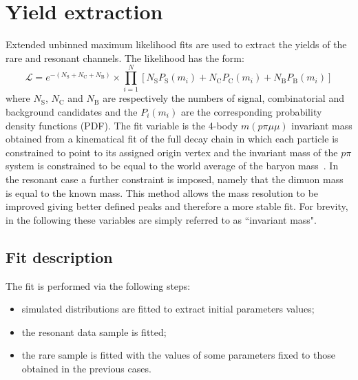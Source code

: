 \section{Yield extraction}

Extended unbinned maximum likelihood fits are used to extract the yields of the rare and resonant channels.
The likelihood has the form:
%
\begin{equation}
\mathcal{L}=e^{-(N_\mathrm{S}+N_\mathrm{C}+N_{\mathrm{B}})}\times\prod_{i=1}^{N}\left[
N_\mathrm{S}P_{\mathrm{S}}(m_i)+N_\mathrm{C}P_\mathrm{C}(m_i)+N_{\mathrm{B}}P_{\mathrm{B}}(m_i)\right]
\end{equation}
\noindent
where $N_\mathrm{S}$, $N_\mathrm{C}$ and $N_\mathrm{B}$ are respectively the numbers of signal, 
combinatorial and \KS background candidates and the $P_i(m_i)$ are the corresponding probability density functions (PDF).
The fit variable is the 4-body $m(p\pi\mu\mu)$ invariant mass obtained from
a kinematical fit of the full decay chain in which each particle is constrained to point to its
assigned origin vertex and the invariant mass of the $p\pi$ system is constrained to be equal to
the world average of the \Lz baryon mass~\cite{PDG2014}. In the resonant case a further constraint is imposed, namely 
that the dimuon mass is equal to the known \jpsi mass. This method allows the mass resolution to be improved giving
better defined peaks and therefore a more stable fit. For brevity, in the following these variables are
simply referred to as ``invariant mass".

\subsection{Fit description}
\label{sec:Lb_fit}

The fit is performed via the following steps:
%
\begin{itemize}
\item simulated distributions are fitted to extract initial parameters values;
\item the resonant data sample is fitted;
\item the rare sample is fitted with the values of some parameters fixed to those obtained in the previous cases.
\end{itemize}
%

